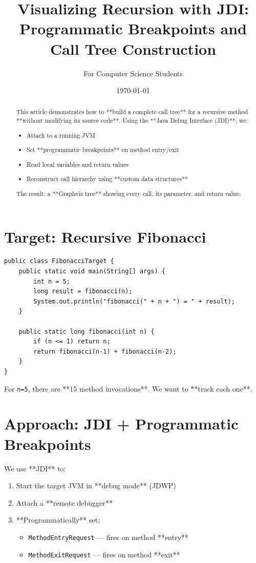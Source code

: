 \documentclass[11pt,a4paper]{article}
\title{Visualizing Recursion with JDI:\\
Programmatic Breakpoints and Call Tree Construction}
\author{For Computer Science Students}
\date{\today}
\begin{document}
    \maketitle

    \begin{abstract}
        This article demonstrates how to **build a complete call tree** for a recursive method **without modifying its source code**.
        Using the **Java Debug Interface (JDI)**, we:
        \begin{itemize}
            \item Attach to a running JVM
            \item Set **programmatic breakpoints** on method entry/exit
            \item Read local variables and return values
            \item Reconstruct call hierarchy using **custom data structures**
        \end{itemize}
        The result: a **Graphviz tree** showing every call, its parameter, and return value.
    \end{abstract}

    \section{Target: Recursive Fibonacci}

    \begin{lstlisting}[caption={FibonacciTarget.java}]
public class FibonacciTarget {
    public static void main(String[] args) {
        int n = 5;
        long result = fibonacci(n);
        System.out.println("fibonacci(" + n + ") = " + result);
    }

    public static long fibonacci(int n) {
        if (n <= 1) return n;
        return fibonacci(n-1) + fibonacci(n-2);
    }
}
    \end{lstlisting}

    For \texttt{n=5}, there are **15 method invocations**.
    We want to **track each one**.

    \section{Approach: JDI + Programmatic Breakpoints}

    We use **JDI** to:
    \begin{enumerate}
        \item Start the target JVM in **debug mode** (JDWP)
        \item Attach a **remote debugger**
        \item **Programmatically** set:
        \begin{itemize}
            \item \texttt{MethodEntryRequest} — fires on method **entry**
            \item \texttt{MethodExitRequest} — fires on method **exit**
        \end{itemize}
    \end{enumerate}
\end{document}
